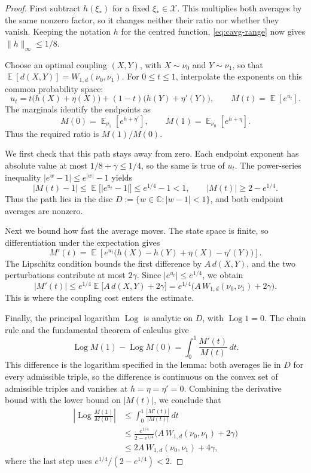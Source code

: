 \documentclass[11pt,reqno]{article}
\theoremstyle{plain}
\theoremstyle{definition}
\theoremstyle{remark}
\theoremstyle{definition}
\theoremstyle{remark}
\newcommand{\C}{\mathbb{C}}
\newcommand{\Log}{\operatorname{Log}}          %
\DeclareMathOperator{\E}{\mathbb{E}}
\newcommand{\Wd}{W_{1,d}}                        %
\begin{document}
\begin{proof}
First subtract \(h(\xi_*)\) for a fixed \(\xi_*\in\mathcal X\).
This multiplies both averages by the same nonzero factor, so it changes
neither their ratio nor whether they vanish.  Keeping the notation \(h\)
for the centred function, \eqref{eq:cavg-range} now gives
\(\lVert h\rVert_\infty\le1/8\).

Choose an optimal coupling \((X,Y)\), with \(X\sim\nu_0\) and
\(Y\sim\nu_1\), so that
\(\E[d(X,Y)]=\Wd(\nu_0,\nu_1)\).  For \(0\le t\le1\), interpolate
the exponents on this common probability space:
\[
  u_t=t\bigl(h(X)+\eta(X)\bigr)
      +(1-t)\bigl(h(Y)+\eta'(Y)\bigr),
  \qquad M(t)=\E[e^{u_t}].
\]
The marginals identify the endpoints as
\[
  M(0)=\E_{\nu_1}[e^{h+\eta'}],
  \qquad M(1)=\E_{\nu_0}[e^{h+\eta}].
\]
Thus the required ratio is \(M(1)/M(0)\).

We first check that this path stays away from zero.  Each endpoint
exponent has absolute value at most \(1/8+\gamma\le1/4\), so the same
is true of \(u_t\).  The power-series inequality
\(|e^w-1|\le e^{|w|}-1\) yields
\[
  |M(t)-1|\le\E\bigl[|e^{u_t}-1|\bigr]
      \le e^{1/4}-1<1,
  \qquad |M(t)|\ge2-e^{1/4}.
\]
Thus the path lies in the disc \(D:=\{w\in\C:|w-1|<1\}\), and both
endpoint averages are nonzero.

Next we bound how fast the average moves.  The state space is finite,
so differentiation under the expectation gives
\[
  M'(t)=\E\!\left[e^{u_t}
    \bigl(h(X)-h(Y)+\eta(X)-\eta'(Y)\bigr)\right].
\]
The Lipschitz condition bounds the first difference by \(A\,d(X,Y)\),
and the two perturbations contribute at most \(2\gamma\).  Since
\(|e^{u_t}|\le e^{1/4}\), we obtain
\[
  |M'(t)|
  \le e^{1/4}\E\bigl[A\,d(X,Y)+2\gamma\bigr]
  =e^{1/4}\bigl(A\,\Wd(\nu_0,\nu_1)+2\gamma\bigr).
\]
This is where the coupling cost enters the estimate.

Finally, the principal logarithm \(\Log\) is analytic on \(D\), with
\(\Log1=0\).  The chain rule and the fundamental theorem of calculus give
\[
  \Log M(1)-\Log M(0)=\int_0^1\frac{M'(t)}{M(t)}\,dt.
\]
This difference is the logarithm specified in the lemma: both averages
lie in \(D\) for every admissible triple, so the difference is continuous
on the convex set of admissible triples and vanishes at
\(h=\eta=\eta'=0\).  Combining the derivative bound
with the lower bound on \(|M(t)|\), we conclude that
\[
\begin{aligned}
  \left|\Log\frac{M(1)}{M(0)}\right|
  &\le\int_0^1\frac{|M'(t)|}{|M(t)|}\,dt\\
  &\le\frac{e^{1/4}}{2-e^{1/4}}
       \bigl(A\,\Wd(\nu_0,\nu_1)+2\gamma\bigr)\\
  &\le2A\,\Wd(\nu_0,\nu_1)+4\gamma,
\end{aligned}
\]
where the last step uses \(e^{1/4}/(2-e^{1/4})<2\).
\end{proof}
\end{document}
